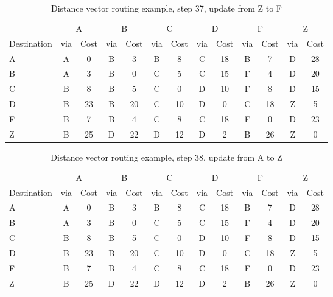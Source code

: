 \begin{table}
    \caption{Distance vector  routing example, step 37, update from Z to F }
    \label{tab:dv:step:37}
\begin{tabular}{l|c|c|c|c|c|c|c|c|c|c|c|c}
    \toprule
      & \multicolumn{2}{c|}{A}&\multicolumn{2}{c|}{B}&\multicolumn{2}{c|}{C}&\multicolumn{2}{c|}{D}&\multicolumn{2}{c|}{F}&\multicolumn{2}{c|}{Z} \\
    Destination & via&Cost&via&Cost&via&Cost&via&Cost&via&Cost&via&Cost \\ 
    \midrule
    A & A & 0 &B & 3 &B & 8 &C & 18 &B & 7 &D & 28 
 \\B & A & 3 &B & 0 &C & 5 &C & 15 &F & 4 &D & 20 
 \\C & B & 8 &B & 5 &C & 0 &D & 10 &F & 8 &D & 15 
 \\D & B & 23 &B & 20 &C & 10 &D & 0 &C & 18 &Z & 5 
 \\F & B & 7 &B & 4 &C & 8 &C & 18 &F & 0 &D & 23 
 \\Z & B & 25 &D & 22 &D & 12 &D & 2 &B & 26 &Z & 0 
    \\ \bottomrule 
\end{tabular}
\end{table}
    

\begin{table}
    \caption{Distance vector  routing example, step 38, update from A to Z }
    \label{tab:dv:step:38}
\begin{tabular}{l|c|c|c|c|c|c|c|c|c|c|c|c}
    \toprule
      & \multicolumn{2}{c|}{A}&\multicolumn{2}{c|}{B}&\multicolumn{2}{c|}{C}&\multicolumn{2}{c|}{D}&\multicolumn{2}{c|}{F}&\multicolumn{2}{c|}{Z} \\
    Destination & via&Cost&via&Cost&via&Cost&via&Cost&via&Cost&via&Cost \\ 
    \midrule
    A & A & 0 &B & 3 &B & 8 &C & 18 &B & 7 &D & 28 
 \\B & A & 3 &B & 0 &C & 5 &C & 15 &F & 4 &D & 20 
 \\C & B & 8 &B & 5 &C & 0 &D & 10 &F & 8 &D & 15 
 \\D & B & 23 &B & 20 &C & 10 &D & 0 &C & 18 &Z & 5 
 \\F & B & 7 &B & 4 &C & 8 &C & 18 &F & 0 &D & 23 
 \\Z & B & 25 &D & 22 &D & 12 &D & 2 &B & 26 &Z & 0 
    \\ \bottomrule 
\end{tabular}
\end{table}
    

